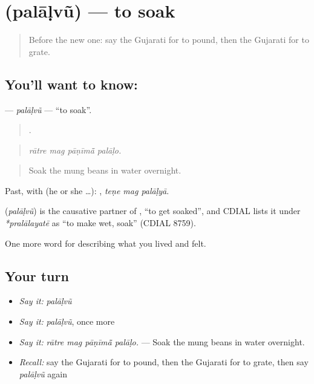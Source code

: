 \section[\texorpdfstring{\gu{પલાળવું} (palāḷvũ)}{પલાળવું (palāḷvũ)}]{ (palāḷvũ) — to soak}

\label{lesson:GU-C522-palaalvu}



\begin{quote}
Before the new one: say the Gujarati for to pound, then the Gujarati for to grate.
\end{quote}

\subsection*{You'll want to know: }
\textbf{} — \emph{palāḷvũ} — \textquotedblleft{}to soak\textquotedblright{}.

\begin{quote}
   .
\end{quote}

\begin{quote}
\emph{rātre mag pāṇīmā̃ palāḷo.}
\end{quote}

\begin{quote}
Soak the mung beans in water overnight.
\end{quote}

Past, with  (he or she …):   , \emph{teṇe mag palāḷyā}.

\begin{cousinweb}
\textbf{} (\emph{palāḷvũ}) is the causative partner of \textbf{}, \textquotedblleft{}to get soaked\textquotedblright{}, and CDIAL lists it under \emph{*pralālayatē} as \textquotedblleft{}to make wet, soak\textquotedblright{} (CDIAL 8759).
\end{cousinweb}

\begin{grammarlens}[title={What you've built}]
One more word for describing what you lived and felt.
\end{grammarlens}

\subsection*{Your turn}
\begin{itemize}
\raggedright
  \item \emph{Say it:} \emph{palāḷvũ}
  \item \emph{Say it:} \emph{palāḷvũ}, once more
  \item \emph{Say it:} \emph{rātre mag pāṇīmā̃ palāḷo.} — Soak the mung beans in water overnight.
  \item \emph{Recall:} say the Gujarati for to pound, then the Gujarati for to grate, then say \emph{palāḷvũ} again
\end{itemize}

